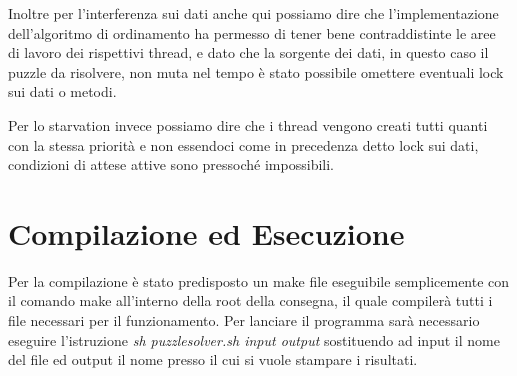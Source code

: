 \documentclass[11pt]{article}
\begin{document}
Inoltre per l'interferenza sui dati anche qui possiamo dire che l'implementazione dell'algoritmo di ordinamento ha permesso di tener bene contraddistinte le aree di lavoro dei rispettivi thread, e dato che la sorgente dei dati, in questo caso il puzzle da risolvere, non muta nel tempo è stato possibile omettere eventuali lock sui dati o metodi. 

Per lo starvation invece possiamo dire che i thread vengono creati tutti quanti con la stessa priorità e non essendoci come in precedenza detto lock sui dati, condizioni di attese attive sono pressoché impossibili.
\section{Compilazione ed Esecuzione}
Per la compilazione è stato predisposto un make file eseguibile semplicemente con il comando make all'interno della root della consegna, il quale compilerà tutti i file necessari per il funzionamento. Per lanciare il programma sarà necessario eseguire l'istruzione \textit{sh puzzlesolver.sh input output} sostituendo ad input il nome del file ed output il nome presso il cui si vuole stampare i risultati.
\end{document}
